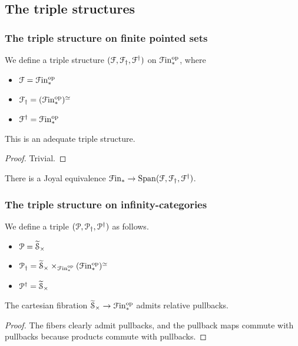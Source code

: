 \documentclass[main.tex]{subfiles}
\begin{document}
\subsection{The triple structures}
\label{ssc:the_triple_structures}

\subsubsection{The triple structure on finite pointed sets}
\label{sss:the_triple_structure_on_finite_pointed_sets}

We define a triple structure $(\mathcal{F}, \mathcal{F}_{\dagger}, \mathcal{F}^{\dagger})$ on $\mathcal{F}\mathrm{in}_{*}^{\mathrm{op}}$, where
\begin{itemize}
  \item $\mathcal{F} = \mathcal{F}\mathrm{in}_{*}^{\mathrm{op}}$

  \item $\mathcal{F}_{\dagger} = (\mathcal{F}\mathrm{in}_{*}^{\mathrm{op}})^{\simeq}$

  \item $\mathcal{F}^{\dagger} = \mathcal{F}\mathrm{in}_{*}^{\mathrm{op}}$
\end{itemize}

\begin{proposition}
  This is an adequate triple structure.
\end{proposition}
\begin{proof}
  Trivial.
\end{proof}

\begin{proposition}
  There is a Joyal equivalence $\mathcal{F}\mathrm{in}_{*} \to \mathrm{Span}(\mathcal{F}, \mathcal{F}_{\dagger}, \mathcal{F}^{\dagger})$.
\end{proposition}

\subsubsection{The triple structure on infinity-categories}
\label{sss:the_triple_structure_on_categories}

We define a triple $(\mathcal{P}, \mathcal{P}_{\dagger}, \mathcal{P}^{\dagger})$ as follows.
\begin{itemize}
  \item $\mathcal{P} = \widetilde{\mathcal{S}}_{\times}$

  \item $\mathcal{P}_{\dagger} = \widetilde{\mathcal{S}}_{\times} \times_{\mathcal{F}\mathrm{in}_{*}^{\mathrm{op}}}(\mathcal{F}\mathrm{in}_{*}^{\mathrm{op}})^{\simeq}$

  \item $\mathcal{P}^{\dagger} = \widetilde{\mathcal{S}}_{\times}$
\end{itemize}

\begin{proposition}
  The cartesian fibration $\widetilde{\mathcal{S}}_{\times} \to \mathcal{F}\mathrm{in}_{*}^{\mathrm{op}}$ admits relative pullbacks.
\end{proposition}
\begin{proof}
  The fibers clearly admit pullbacks, and the pullback maps commute with pullbacks because products commute with pullbacks.
\end{proof}
\end{document}
